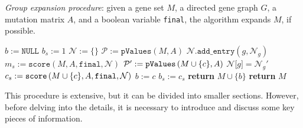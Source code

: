 \begin{algorithm}[H]
    \caption{
        \textit{Group expansion procedure}: given a gene set $M$, a directed gene graph $G$, a mutation matrix $A$, and a boolean variable \texttt{final}, the algorithm expands $M$, if possible.
    }

        \label{expand_group_mutex}
    \begin{algorithmic}[1]
            \State $b := \texttt{NULL}$ 
            \State $b_s := 1$ 
            \State $\mathcal N := \texttt{\{\}}$
                \State $\mathcal P := \texttt{pValues}(M, A)$ 
                    \State $\mathcal N.\texttt{add\_entry}(g, \mathcal N_g)$ 
                \EndFor
            \EndIf
            \State $m_s := \texttt{score}(M, A, \texttt{final}, \mathcal N)$ 
             
                    \State $\mathcal P' := \texttt{pValues}\left(M \cup \{c\}, A\right)$
                        \State $\mathcal N \texttt{[}g\texttt{]} = \mathcal N_g'$ 
                    \EndFor
                \EndIf
                \State $c_s := \texttt{score} \left(M \cup \{c\}, A, \texttt{final}, \mathcal N\right)$ 
                 
                    \State $b := c$
                    \State $b_s := c_s$
                \EndIf
            \EndFor
            \State \textbf{return} $M \cup \{b\}$
        \EndIf
        \State \textbf{return} $M$
        \EndFunction
    \end{algorithmic}
\end{algorithm}

This procedure is extensive, but it can be divided into smaller sections. However, before delving into the details, it is necessary to introduce and discuss some key pieces of information.

